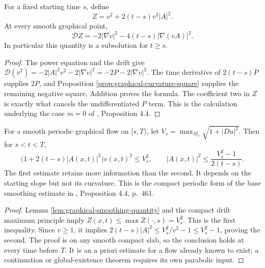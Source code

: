 \begin{lemma}\label{lem:graphical-smoothing-quantity}
For a fixed starting time $s$, define
\[
 Z=v^2+2(t-s)v^2|A|^2.
\]
At every smooth graphical point,
\[
 \mathcal DZ=-2|\nabla v|^2-4(t-s)|\nabla(vA)|^2.
\]
In particular this quantity is a subsolution for $t\geq s$.
\end{lemma}
\begin{proof}
The power equation and the drift give
$\mathcal D(v^2)=-2|A|^2v^2-2|\nabla v|^2=-2P-2|\nabla v|^2$.
The time derivative of $2(t-s)P$ supplies $2P$, and Proposition \ref{prop:graphical-curvature-square} supplies the remaining negative square. Addition proves the formula. The coefficient two in $Z$ is exactly what cancels the undifferentiated $P$ term. This is the calculation underlying the case $m=0$ of \cite{EH89}, Proposition 4.4.
\end{proof}

\begin{theorem}\label{thm:periodic-graph-curvature-smoothing}
For a smooth periodic graphical flow on $[s,T)$, let $V_s=\max_{M_s}\sqrt{1+|Du|^2}$. Then for $s<t<T$,
\[
 \bigl(1+2(t-s)|A(x,t)|^2\bigr)v(x,t)^2\leq V_s^2,
 \qquad
 |A(x,t)|^2\leq\frac{V_s^2-1}{2(t-s)}.
\]
The first estimate retains more information than the second. It depends on the starting slope but not its curvature. This is the compact periodic form of the base smoothing estimate in \cite{EH89}, Proposition 4.4, p.~461.
\end{theorem}
\begin{proof}
Lemma \ref{lem:graphical-smoothing-quantity} and the compact drift maximum principle imply $Z(x,t)\leq\max Z(\cdot,s)=V_s^2$. This is the first inequality. Since $v\geq1$, it implies $2(t-s)|A|^2\leq V_s^2/v^2-1\leq V_s^2-1$, proving the second. The proof is on any smooth compact slab, so the conclusion holds at every time before $T$. It is an a priori estimate for a flow already known to exist; a continuation or global-existence theorem requires its own parabolic input.
\end{proof}

